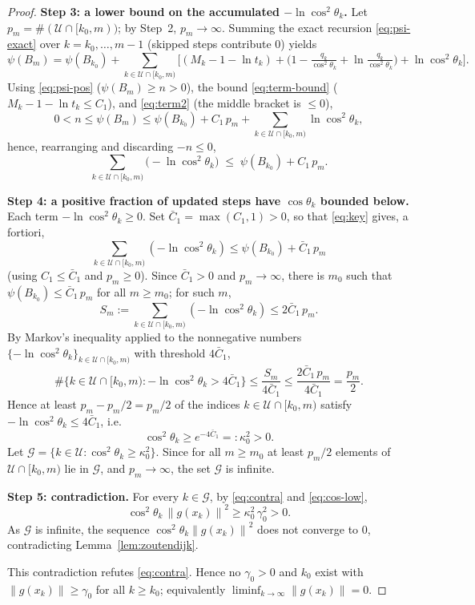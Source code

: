 \documentclass{amsart}
\theoremstyle{definition}
\newcommand{\norm}[1]{\left\lVert #1\right\rVert}
\begin{document}
\begin{proof}
\medskip\noindent\textbf{Step 3: a lower bound on the accumulated
$-\ln\cos^2\theta_k$.}
Let $p_m=\#(\mathcal{U}\cap[k_0,m))$; by Step~2, $p_m\to\infty$. Summing the
exact recursion \eqref{eq:psi-exact} over $k=k_0,\dots,m-1$ (skipped steps
contribute $0$) yields
\[
   \psi(B_m)=\psi(B_{k_0})
   +\!\!\sum_{k\in\mathcal{U}\cap[k_0,m)}\!\!
   \Big[(M_k-1-\ln t_k)
   +\big(1-\tfrac{q_k}{\cos^2\theta_k}+\ln\tfrac{q_k}{\cos^2\theta_k}\big)
   +\ln\cos^2\theta_k\Big].
\]
Using \eqref{eq:psi-pos} ($\psi(B_m)\ge n>0$), the bound \eqref{eq:term-bound}
($M_k-1-\ln t_k\le C_1$), and \eqref{eq:term2} (the middle bracket is $\le0$),
\[
   0<n\le\psi(B_m)\le\psi(B_{k_0})+C_1\,p_m
   +\!\!\sum_{k\in\mathcal{U}\cap[k_0,m)}\!\!\ln\cos^2\theta_k ,
\]
hence, rearranging and discarding $-n\le0$,
\begin{equation}\label{eq:key}
   \sum_{k\in\mathcal{U}\cap[k_0,m)}\big(-\ln\cos^2\theta_k\big)
   \;\le\;\psi(B_{k_0})+C_1\,p_m .
\end{equation}

\medskip\noindent\textbf{Step 4: a positive fraction of updated steps have
$\cos\theta_k$ bounded below.}
Each term $-\ln\cos^2\theta_k\ge0$. Set $\bar C_1=\max(C_1,1)>0$, so that
\eqref{eq:key} gives, a fortiori,
\[
   \sum_{k\in\mathcal{U}\cap[k_0,m)}(-\ln\cos^2\theta_k)\le\psi(B_{k_0})+\bar C_1\,p_m
\]
(using $C_1\le\bar C_1$ and $p_m\ge0$). Since $\bar C_1>0$ and $p_m\to\infty$,
there is $m_0$ such that $\psi(B_{k_0})\le\bar C_1\,p_m$ for all $m\ge m_0$;
for such $m$,
\[
   S_m:=\sum_{k\in\mathcal{U}\cap[k_0,m)}(-\ln\cos^2\theta_k)\le 2\bar C_1\,p_m .
\]
By Markov's inequality applied to the nonnegative numbers
$\{-\ln\cos^2\theta_k\}_{k\in\mathcal{U}\cap[k_0,m)}$ with threshold
$4\bar C_1$,
\[
   \#\{k\in\mathcal{U}\cap[k_0,m):-\ln\cos^2\theta_k>4\bar C_1\}
   \le\frac{S_m}{4\bar C_1}
   \le\frac{2\bar C_1\,p_m}{4\bar C_1}=\frac{p_m}{2}.
\]
Hence at least $p_m-p_m/2=p_m/2$ of the indices $k\in\mathcal{U}\cap[k_0,m)$
satisfy $-\ln\cos^2\theta_k\le 4\bar C_1$, i.e.
\begin{equation}\label{eq:cos-low}
   \cos^2\theta_k\ge e^{-4\bar C_1}=:\kappa_0^2>0 .
\end{equation}
Let $\mathcal{G}=\{k\in\mathcal{U}:\cos^2\theta_k\ge\kappa_0^2\}$. Since for all
$m\ge m_0$ at least $p_m/2$ elements of $\mathcal{U}\cap[k_0,m)$ lie in
$\mathcal{G}$, and $p_m\to\infty$, the set $\mathcal{G}$ is infinite.


\medskip\noindent\textbf{Step 5: contradiction.} For every $k\in\mathcal{G}$, by
\eqref{eq:contra} and \eqref{eq:cos-low},
\[
   \cos^2\theta_k\,\norm{g(x_k)}^2\ge\kappa_0^2\,\gamma_0^2>0 .
\]
As $\mathcal{G}$ is infinite, the sequence $\cos^2\theta_k\norm{g(x_k)}^2$ does
not converge to $0$, contradicting Lemma~\ref{lem:zoutendijk}.

This contradiction refutes \eqref{eq:contra}. Hence no $\gamma_0>0$ and $k_0$
exist with $\norm{g(x_k)}\ge\gamma_0$ for all $k\ge k_0$; equivalently
$\liminf_{k\to\infty}\norm{g(x_k)}=0$.
\end{proof}
\end{document}
